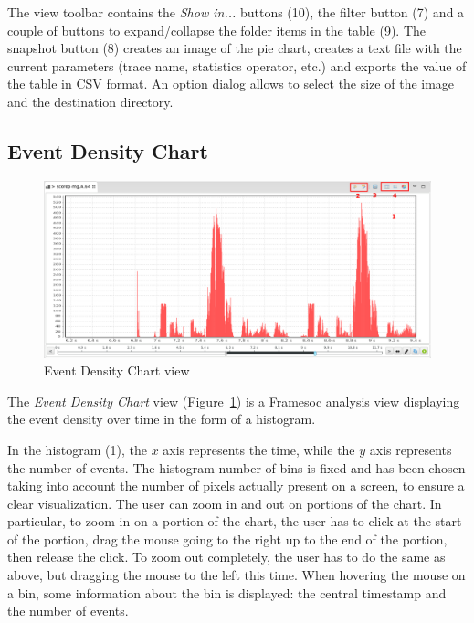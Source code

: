 \documentclass[twoside]{article}
\begin{document}
\begin{sloppypar}
The view toolbar contains the \emph{Show in...} buttons (\num{10}), the filter button (\num{7}) and a couple of buttons to expand/collapse the folder items in the table (\num{9}).
The snapshot button (\num{8}) creates an image of the pie chart, creates a text file with the current parameters (trace name, statistics operator, etc.) and exports the value of the table in CSV format.
An option dialog allows to select the size of the image and the destination directory.

\subsection{Event Density Chart}
\label{subsec:histogram}

\begin{figure}[h!]
  \centering
    \includegraphics[width=1.0\textwidth]{images/histogram.png}
  \caption{Event Density Chart view}
  \label{fig:histogram}
\end{figure}

The \emph{Event Density Chart} view (Figure~\ref{fig:histogram}) is a Framesoc analysis view displaying the event density over time in the form of a histogram.

In the histogram (\num{1}), the $x$ axis represents the time, while the $y$ axis represents the number of events.
The histogram number of bins is fixed and has been chosen taking into account the number of pixels actually present on a screen, to ensure a clear visualization. 
The user can zoom in and out on portions of the chart.
In particular, to zoom in on a portion of the chart, the user has to click at the start of the portion, drag the mouse going to the right up to the end of the portion, then release the click.
To zoom out completely, the user has to do the same as above, but dragging the mouse to the left this time.
When hovering the mouse on a bin, some information about the bin is displayed: the central timestamp and the number of events.


\end{sloppypar}
\end{document}
